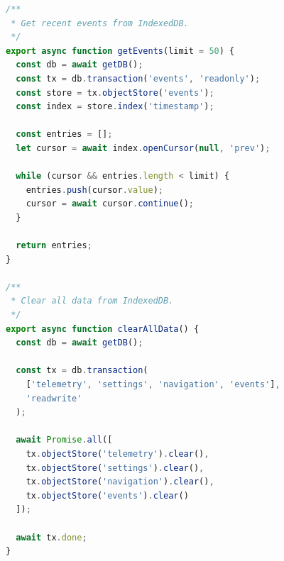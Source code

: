 \begin{lstlisting}[language=JavaScript, caption=src/storage/indexedDB.js]
/**
 * Get recent events from IndexedDB.
 */
export async function getEvents(limit = 50) {
  const db = await getDB();
  const tx = db.transaction('events', 'readonly');
  const store = tx.objectStore('events');
  const index = store.index('timestamp');

  const entries = [];
  let cursor = await index.openCursor(null, 'prev');

  while (cursor && entries.length < limit) {
    entries.push(cursor.value);
    cursor = await cursor.continue();
  }

  return entries;
}

/**
 * Clear all data from IndexedDB.
 */
export async function clearAllData() {
  const db = await getDB();

  const tx = db.transaction(
    ['telemetry', 'settings', 'navigation', 'events'],
    'readwrite'
  );

  await Promise.all([
    tx.objectStore('telemetry').clear(),
    tx.objectStore('settings').clear(),
    tx.objectStore('navigation').clear(),
    tx.objectStore('events').clear()
  ]);

  await tx.done;
}
\end{lstlisting}

